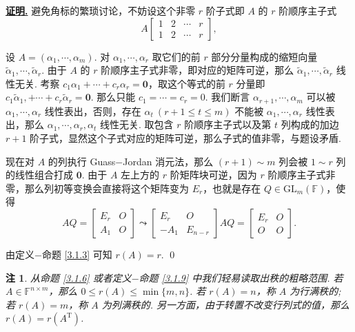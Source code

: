 \documentclass[10pt,openany]{article}
\theoremstyle{thmstyle} %
\theoremstyle{defstyle} %
\theoremstyle{prostyle} %
\theoremstyle{exastyle}
\theoremstyle{remstyle}
\newtheorem{remark}[theorem]{注}
\renewenvironment{proof}[1][证明]{\par\underline{\textbf{#1.}} \;\fangsong}{\qed\par}
\newcommand{\T}{^{\text{T}}}
\newcommand{\F}{\mathbb{F}}
\newcommand{\gfm}{\text{GL}_m(\mathbb{F})}
\newcommand{\nm}{^{n \times m}}
\begin{document}
\begin{proof}
	避免角标的繁琐讨论，不妨设这个非零 \( r \) 阶子式即 \( A \) 的 \( r \) 阶顺序主子式
	\[ A\begin{bmatrix}
		1 & 2 & \cdots & r \\
		1 & 2 & \cdots & r
	\end{bmatrix}, \]
	
	设 \( A=(\alpha_1,\cdots,\alpha_m) \). 对 \( \alpha_1,\cdots,\alpha_r \) 取它们的前 \( r \) 部分分量构成的缩短向量 \( \widetilde{\alpha}_1, \cdots, \widetilde{\alpha}_r \). 由于 \( A \) 的 \( r \) 阶顺序主子式非零，即对应的矩阵可逆，那么 \( \widetilde{\alpha}_1, \cdots, \widetilde{\alpha}_r  \) 线性无关. 考察 \( c_1\alpha_1+\cdots+c_r\alpha_r=\bm{0} \)，取这个等式的前 \( r \) 分量即 \( c_1\widetilde{\alpha}_1,+\cdots+c_r\widetilde{\alpha}_r=\bm{0} \). 那么只能 \( c_1=\cdots=c_r=0 \). 我们断言 \( \alpha_{r+1},\cdots,\alpha_m \) 可以被 \( \alpha_1,\cdots,\alpha_r \) 线性表出，否则，存在 \( \alpha_t \ (r+1 \leq t \leq m) \) 不能被  \( \alpha_1,\cdots,\alpha_r \) 线性表出，那么 \( \alpha_1,\cdots,\alpha_r,\alpha_t \) 线性无关. 取包含 \( r \) 阶顺序主子式以及第 \( t \) 列构成的加边 \( r+1 \) 阶子式，显然这个子式对应的矩阵可逆，那么子式的值非零，与题设矛盾.
	
	现在对 \( A \) 的列执行 Guass\(-\)Jordan 消元法，那么 \( (r+1) \sim m \) 列会被 \( 1 \sim r \) 列的线性组合打成 \( \bm{0} \). 由于 \( A \) 左上方的 \( r \) 阶矩阵块可逆，因为 \( r \) 阶顺序主子式非零，那么列初等变换会直接将这个矩阵变为 \( E_r \)，也就是存在 \( Q \in \gfm \)，使得
	\[ AQ=\begin{bmatrix}
		E_r & O \\
		A_1 & O
	\end{bmatrix} \leadsto \begin{bmatrix}
	E_r & O \\
	-A_1 & E_{n-r}
	\end{bmatrix}AQ=\begin{bmatrix}
	E_r & O \\
	O & O
	\end{bmatrix}. \]
	
	由定义\(-\)命题 \ref{3.1.3} 可知 \( r(A)=r \).
\end{proof}

\begin{remark} \label{3.1.12}
	从命题 \ref{3.1.6} 或者定义\(-\)命题 \ref{3.1.9} 中我们轻易读取出秩的粗略范围. 若 \( A \in \F\nm \)，那么 \( 0 \leq r(A) \leq \min\{m,n\} \). 若 \( r(A)=n \)，称 \( A \) 为行满秩的; 若 \( r(A)=m \)，称 \( A \) 为列满秩的. 另一方面，由于转置不改变行列式的值，那么 \( r(A)=r(A\T) \).
\end{remark}
\end{document}
